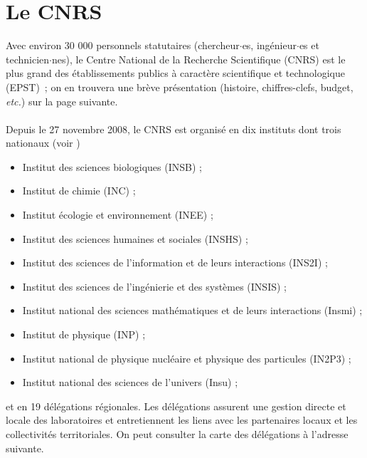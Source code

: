



\chapter{Le CNRS}
\label{CNRS}



Avec environ 30 000 personnels statutaires (chercheur$\cdot$es, ing\'enieur$\cdot$es et technicien$\cdot$nes), le Centre National de la
Recherche Scientifique (CNRS) est le plus grand des
\'etablissements publics \`a caract\`ere scientifique et
technologique (EPST)~; on en trouvera une br\`eve pr\'esentation
(histoire, chiffres-clefs, budget, {\em etc.}) sur la page suivante.\\
\\
Depuis le 27 novembre 2008, le CNRS est organis\'e
en dix instituts dont trois nationaux (voir )
\begin{itemize}
\item Institut des sciences biologiques (INSB) ;
\item Institut de chimie (INC) ;
\item Institut \'ecologie et environnement (INEE) ;
\item Institut des sciences humaines et sociales (INSHS) ;
\item Institut des sciences de l'information et de leurs interactions (INS2I) ;
\item Institut des sciences de l'ing\'enierie et des syst\`emes (INSIS) ;
\item Institut national des sciences math\'ematiques et de leurs interactions (Insmi) ;
\item Institut de physique (INP) ;
\item Institut national de physique nucl\'eaire et physique des particules (IN2P3) ;
\item Institut national des sciences de l'univers (Insu) ;
\end{itemize}
et en 19 d\'el\'egations r\'egionales. Les d\'el\'egations assurent
une gestion directe et locale des laboratoires et entretiennent les
liens avec les partenaires locaux et les collectivit\'es
territoriales. On peut consulter la carte des d\'el\'egations \`a
l'adresse suivante. 


